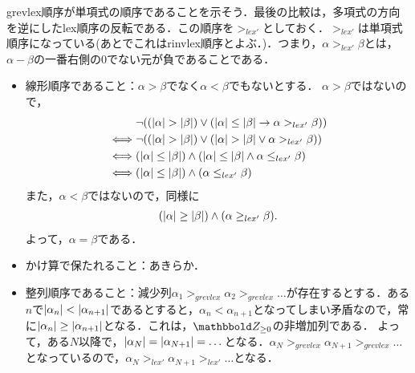 \documentclass[9pt]{ltjsarticle}
\begin{document}
grevlex順序が単項式の順序であることを示そう．最後の比較は，多項式の方向を逆にしたlex順序の反転である．この順序を$>_{lex'}$としておく．$>_{lex'}$は単項式順序になっている(あとでこれはrinvlex順序とよぶ．)．つまり，$\alpha >_{lex'} \beta$とは，$\alpha-\beta$の一番右側の0でない元が負であることである．
\begin{myproof}
 \begin{itemize}
  \item 線形順序であること：$\alpha > \beta$でなく$\alpha < \beta$でもないとする．
$\alpha > \beta$ではないので，
\begin{align}
& \neg((\myabs{\alpha} > \myabs{\beta}) \lor (\myabs{\alpha}\le \myabs{\beta} \rightarrow \alpha >_{lex'} \beta))\\
 \iff&
 \neg((\myabs{\alpha} > \myabs{\beta}) \lor (\myabs{\alpha}> \myabs{\beta} \lor \alpha >_{lex'} \beta))\\
\iff &
 (\myabs{\alpha} \le \myabs{\beta}) \land (\myabs{\alpha}\le \myabs{\beta} \land \alpha \le_{lex'} \beta)\\
 \iff&
(\myabs{\alpha} \le \myabs{\beta}) \land (\alpha \le_{lex'} \beta)
\end{align}
また，$\alpha < \beta$ではないので，同様に
\begin{align}
 (\left|\alpha\right|\ge \left|\beta\right|) \land (\alpha \ge_{lex'} \beta).
\end{align}
よって，$\alpha = \beta$である．
  \item かけ算で保たれること：あきらか．
  \item 整列順序であること：減少列$\alpha_1 >_{grevlex} \alpha_2 >_{grevlex} \dots$が存在するとする．ある$n$で$\left|\alpha_n\right| < \left|\alpha_{n+1}\right|$であるとすると，$\alpha_n < \alpha_{n+1}$となってしまい矛盾なので，常に$\left|\alpha_n\right| \ge \left|\alpha_{n+1}\right|$となる．これは，$\Zge$の非増加列である．
よって，ある$N$以降で，$\left|\alpha_N\right| = \left|\alpha_{N+1}\right| = \dots $となる．$\alpha_N >_{grevlex} \alpha_{N+1}>_{grevlex} \dots$となっているので，$\alpha_N >_{lex'} \alpha_{N+1} >_{lex'}\dots$となる．
 \end{itemize}
\end{myproof}
\end{document}
